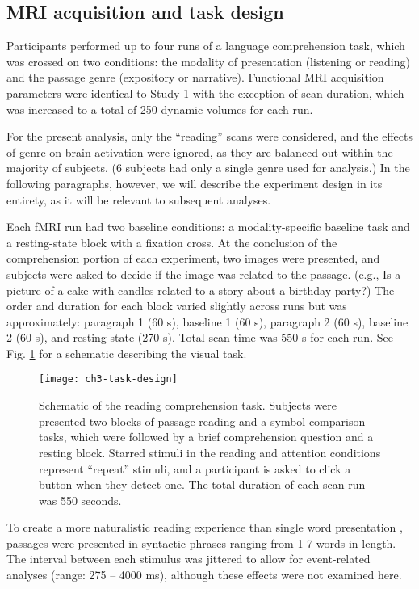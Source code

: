 \subsection{MRI acquisition and task design}

Participants performed up to four runs of a language comprehension task, which was crossed on two conditions: the modality of presentation (listening or reading) and the passage genre (expository or narrative). Functional MRI acquisition parameters were identical to Study 1 with the exception of scan duration, which was increased to a total of 250 dynamic volumes for each run. 

For the present analysis, only the ``reading'' scans were considered, and the effects of genre on brain activation were ignored, as they are balanced out within the majority of subjects. (6 subjects had only a single genre used for analysis.) In the following paragraphs, however, we will describe the experiment design in its entirety, as it will be relevant to subsequent analyses.

Each fMRI run had two baseline conditions: a modality-specific baseline task and a resting-state block with a fixation cross. At the conclusion of the comprehension portion of each experiment, two images were presented, and subjects were asked to decide if the image was related to the passage. (e.g., Is a picture of a cake with candles related to a story about a birthday party?) The order and duration for each block varied slightly across runs but was approximately: paragraph 1 (60 s), baseline 1 (60 s), paragraph 2 (60 s), baseline 2 (60 s), and resting-state (270 s). Total scan time was 550 s for each run. See Fig. \ref{fig:ch3-task-design} for a schematic describing the visual task.

\begin{figure}[t]
	\centering
	\texttt{[image: ch3-task-design]}
	\caption[Schematic of the reading comprehension task.]{Schematic of the reading comprehension task. Subjects were presented two blocks of passage reading and a symbol comparison tasks, which were followed by a brief comprehension question and a resting block. Starred stimuli in the reading and attention conditions represent ``repeat'' stimuli, and a participant is asked to click a button when they detect one. The total duration of each scan run was 550 seconds.}
	\label{fig:ch3-task-design}
\end{figure}

To create a more naturalistic reading experience than single word presentation \citep{Rayner1998}, passages were presented in syntactic phrases ranging from 1-7 words in length. The interval between each stimulus was jittered to allow for event-related analyses (range: 275 – 4000 ms), although these effects were not examined here.

